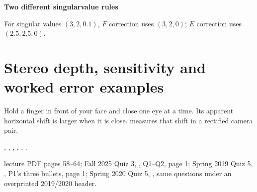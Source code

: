 \documentclass[letterpaper,11pt,english,openany,oneside]{jupyterBook}
\begin{document}
\begin{TextbookBox}
\textbf{Two different singular\sphinxhyphen{}value rules}\par\smallskip

\sphinxAtStartPar
For singular values \((3,2,0.1)\), \(F\) correction uses \((3,2,0)\); \(E\) correction uses \((2.5,2.5,0)\).

\end{TextbookBox}

\sphinxstepscope


\section{Stereo depth, sensitivity and worked error examples}
\label{\detokenize{lectures/lecture04/stereo:stereo-depth-sensitivity-and-worked-error-examples}}\label{\detokenize{lectures/lecture04/stereo:lec04-stereo}}\label{\detokenize{lectures/lecture04/stereo::doc}}
\sphinxAtStartPar
Hold a finger in front of your face and close one eye at a time. Its apparent horizontal shift is larger when it is close.  measures that shift in a rectified camera pair.

\sphinxAtStartPar
{} {\hyperref[\detokenize{lectures/lecture04/stereo:stereo-derive-depth}]{}}, {\hyperref[\detokenize{lectures/lecture04/stereo:stereo-depth-sensitivity}]{}}, {\hyperref[\detokenize{lectures/lecture04/quiz-workbook:ex-lec04-stereo-fall}]{}}, {\hyperref[\detokenize{lectures/lecture04/quiz-workbook:ex-lec04-stereo-spring}]{}}, {\hyperref[\detokenize{lectures/lecture04/stereo:stereo-explorer}]{}}, {\hyperref[\detokenize{lectures/lecture04/quiz-workbook:ex-lec04-search}]{}}.

\sphinxAtStartPar
{} lecture PDF pages 58–64; Fall 2025 Quiz 3, , Q1–Q2, page 1; Spring 2019 Quiz 5, , P1’s three bullets, page 1; Spring 2020 Quiz 5, , same questions under an overprinted 2019/2020 header.

\ignorespaces
{}\ignorespaces
{}\ignorespaces
\end{document}

